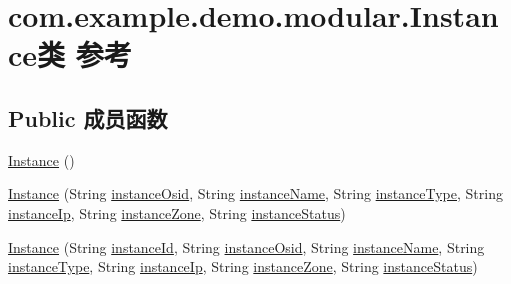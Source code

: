 \hypertarget{classcom_1_1example_1_1demo_1_1modular_1_1_instance}{}\section{com.\+example.\+demo.\+modular.\+Instance类 参考}
\label{classcom_1_1example_1_1demo_1_1modular_1_1_instance}
\subsection*{Public 成员函数}
\begin{DoxyCompactItemize}
\item 
\mbox{\hyperlink{classcom_1_1example_1_1demo_1_1modular_1_1_instance_a506e25709bec7e9a06e33586f38d2852}{Instance}} ()
\item 
\mbox{\hyperlink{classcom_1_1example_1_1demo_1_1modular_1_1_instance_abbb077df1cc4fa4c197821b5d076031a}{Instance}} (String \mbox{\hyperlink{classcom_1_1example_1_1demo_1_1modular_1_1_instance_a7c495785ea43e2bb2a6b020d5d69320b}{instance\+Osid}}, String \mbox{\hyperlink{classcom_1_1example_1_1demo_1_1modular_1_1_instance_a65743efcb65b8f31fc68e0b8847c7210}{instance\+Name}}, String \mbox{\hyperlink{classcom_1_1example_1_1demo_1_1modular_1_1_instance_a9e0d75275c0425596d09c47713ba8572}{instance\+Type}}, String \mbox{\hyperlink{classcom_1_1example_1_1demo_1_1modular_1_1_instance_a7ba10b77832f3bbdd546111ae007090d}{instance\+Ip}}, String \mbox{\hyperlink{classcom_1_1example_1_1demo_1_1modular_1_1_instance_a0076c0dc1b90032ac314eca30728df1e}{instance\+Zone}}, String \mbox{\hyperlink{classcom_1_1example_1_1demo_1_1modular_1_1_instance_a45db58c16ddf36f66834df9b73a743cc}{instance\+Status}})
\item 
\mbox{\hyperlink{classcom_1_1example_1_1demo_1_1modular_1_1_instance_a878758da395badd023bcf1e563bf5917}{Instance}} (String \mbox{\hyperlink{classcom_1_1example_1_1demo_1_1modular_1_1_instance_afa844472164fc3e313d84e932a4387b2}{instance\+Id}}, String \mbox{\hyperlink{classcom_1_1example_1_1demo_1_1modular_1_1_instance_a7c495785ea43e2bb2a6b020d5d69320b}{instance\+Osid}}, String \mbox{\hyperlink{classcom_1_1example_1_1demo_1_1modular_1_1_instance_a65743efcb65b8f31fc68e0b8847c7210}{instance\+Name}}, String \mbox{\hyperlink{classcom_1_1example_1_1demo_1_1modular_1_1_instance_a9e0d75275c0425596d09c47713ba8572}{instance\+Type}}, String \mbox{\hyperlink{classcom_1_1example_1_1demo_1_1modular_1_1_instance_a7ba10b77832f3bbdd546111ae007090d}{instance\+Ip}}, String \mbox{\hyperlink{classcom_1_1example_1_1demo_1_1modular_1_1_instance_a0076c0dc1b90032ac314eca30728df1e}{instance\+Zone}}, String \mbox{\hyperlink{classcom_1_1example_1_1demo_1_1modular_1_1_instance_a45db58c16ddf36f66834df9b73a743cc}{instance\+Status}})

\end{DoxyCompactItemize}
